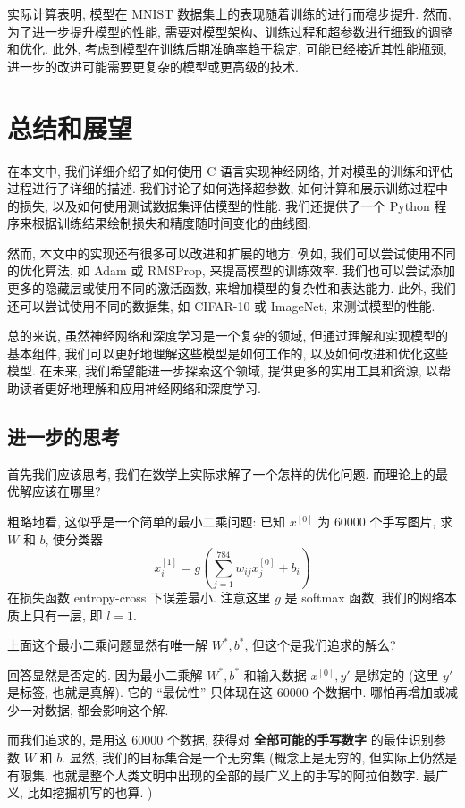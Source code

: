 \documentclass{ctexart}
\begin{document}
实际计算表明, 模型在 MNIST 数据集上的表现随着训练的进行而稳步提升. 然而, 为了进一步提升模型的性能,
需要对模型架构、训练过程和超参数进行细致的调整和优化. 此外, 考虑到模型在训练后期准确率趋于稳定, 可能已经接近其性能瓶颈,
进一步的改进可能需要更复杂的模型或更高级的技术.

\section{总结和展望}
\label{sec::conclusion}

在本文中, 我们详细介绍了如何使用 C 语言实现神经网络, 并对模型的训练和评估过程进行了详细的描述.
我们讨论了如何选择超参数, 如何计算和展示训练过程中的损失, 以及如何使用测试数据集评估模型的性能.
我们还提供了一个 Python 程序来根据训练结果绘制损失和精度随时间变化的曲线图.

然而, 本文中的实现还有很多可以改进和扩展的地方. 例如, 我们可以尝试使用不同的优化算法,
如 Adam 或 RMSProp, 来提高模型的训练效率. 我们也可以尝试添加更多的隐藏层或使用不同的激活函数, 来增加模型的复杂性和表达能力.
此外, 我们还可以尝试使用不同的数据集, 如 CIFAR-10 或 ImageNet, 来测试模型的性能.

总的来说, 虽然神经网络和深度学习是一个复杂的领域, 但通过理解和实现模型的基本组件,
我们可以更好地理解这些模型是如何工作的, 以及如何改进和优化这些模型.
在未来, 我们希望能进一步探索这个领域, 提供更多的实用工具和资源, 以帮助读者更好地理解和应用神经网络和深度学习.

\subsection{进一步的思考}

首先我们应该思考, 我们在数学上实际求解了一个怎样的优化问题. 而理论上的最优解应该在哪里?

粗略地看, 这似乎是一个简单的最小二乘问题: 已知 $x^{[0]}$ 为 $60000$ 个手写图片, 
求 $W$ 和 $b$, 使分类器
$$
x^{[1]}_i = g\left(\sum_{j = 1}^{784} w_{ij} x^{[0]}_j + b_i\right)
$$
在损失函数 entropy-cross 下误差最小. 注意这里 $g$ 是 softmax 函数, 我们的网络本质上只有一层,
即 $l = 1$.

上面这个最小二乘问题显然有唯一解 $W^*, b^*$, 但这个是我们追求的解么?

回答显然是否定的. 因为最小二乘解 $W^*, b^*$ 和输入数据 $x^{[0]}, y'$ 是绑定的 (这里 $y'$ 是标签, 
也就是真解). 它的 ``最优性'' 只体现在这 $60000$ 个数据中. 哪怕再增加或减少一对数据, 都会影响这个解.

而我们追求的, 是用这 $60000$ 个数据, 获得对 {\bfseries 全部可能的手写数字} 的最佳识别参数 $W$ 和 $b$.
显然, 我们的目标集合是一个无穷集 (概念上是无穷的, 但实际上仍然是有限集. 
也就是整个人类文明中出现的全部的最广义上的手写的阿拉伯数字. 最广义, 比如挖掘机写的也算. )
\end{document}
